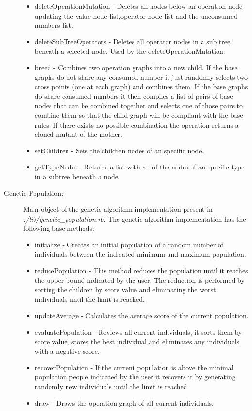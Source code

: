 \documentclass[a4paper,10pt,titlepage]{article}
\begin{document}
\begin{description}
\begin{itemize}
		\item deleteOperationMutation - Deletes all nodes below an operation node updating the value node list,operator node list and the unconsumed numbers list. 
		\item deleteSubTreeOperators - Deletes all operator nodes in a sub tree beneath a selected node. Used by the deleteOperationMutation. 
		\item breed - Combines two operation graphs into a new child. If the base graphs do not share any consumed number it just randomly selects two cross points (one at each graph) and combines them. If the base graphs do share consumed numbers it then compiles a list of pairs of base nodes that can be combined together  and selects one of those pairs to combine them so that the child graph will be compliant with the base rules. If there exists no possible combination the operation returns a cloned mutant of the mother.
		\item setChildren - Sets the children nodes of an specific node. 
		\item getTypeNodes - Returns a list with all of the nodes of an specific type in a subtree beneath a node.
	\end{itemize}
	\item[Genetic Population:] Main object of the genetic algorithm implementation present in \textit{./lib/genetic\_population.rb}. The genetic algorithm implementation has the following base methods:
	\begin{itemize}
		\item initialize - Creates an initial population of a random number of individuals between the indicated minimum and maximum population.
		\item reducePopulation - This method reduces the population until it reaches the upper bound indicated by the user. The reduction is performed by sorting the children by score value and eliminating the worst individuals until the limit is reached.
		\item updateAverage - Calculates the average score of the current population. 
		\item evaluatePopulation - Reviews all current individuals, it sorts them by score value, stores the best individual and eliminates any individuals with a negative score.
		\item recoverPopulation - If the current population is above the minimal population people indicated by the user it recovers it by generating randomly new individuals until the limit is reached.
		\item draw - Draws the operation graph of all current individuals.

\end{itemize}
\end{description}
\end{document}
